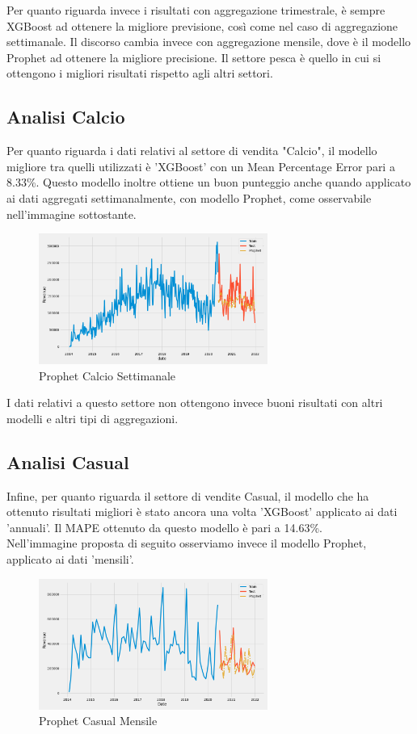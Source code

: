 \documentclass[12pt, a4paper, twocolumn]{article} %
\begin{document}
Per quanto riguarda invece i risultati con aggregazione trimestrale, è sempre XGBoost ad ottenere la migliore previsione, così come nel caso di aggregazione settimanale. Il discorso cambia invece con aggregazione mensile, dove è il modello Prophet ad ottenere la migliore precisione. Il settore pesca è quello in cui si ottengono i migliori risultati rispetto agli altri settori.

\subsection{Analisi Calcio}
Per quanto riguarda i dati relativi al settore di vendita "Calcio", il modello migliore tra quelli utilizzati è 'XGBoost' con un Mean Percentage Error pari a 8.33\%. Questo modello inoltre ottiene un buon punteggio anche quando applicato ai dati aggregati settimanalmente, con modello Prophet, come osservabile nell'immagine sottostante.
\begin{figure}[H]
  \caption{Prophet Calcio Settimanale}
  \begin{center}
    \includegraphics[width=75mm,scale=0.5]{Calcio_settimanale_19.07}
  \end{center}
\end{figure}

I dati relativi a questo settore non ottengono invece buoni risultati con altri modelli e altri tipi di aggregazioni.

\subsection{Analisi Casual}
Infine, per quanto riguarda il settore di vendite Casual, il modello che ha ottenuto risultati migliori è stato ancora una volta 'XGBoost' applicato ai dati 'annuali'. Il MAPE ottenuto da questo modello è pari a 14.63\%.\\
Nell'immagine proposta di seguito osserviamo invece il modello Prophet, applicato ai dati 'mensili'.
\begin{figure}[H]
  \caption{Prophet Casual Mensile}
  \begin{center}
    \includegraphics[width=75mm,scale=0.5]{Casual_mensile_22.88}
  \end{center}
\end{figure}
\end{document}
